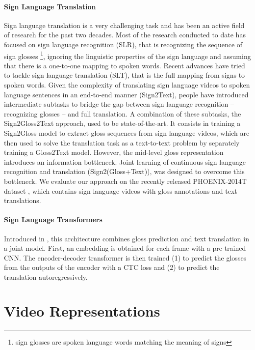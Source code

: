 \documentclass[final]{cvpr}
\begin{document}
\paragraph{Sign Language Translation}Sign language translation is a very challenging task and has been an active field of
research for the past two decades. Most of the research conducted to date has focused on sign language recognition (SLR), that is recognizing the sequence of sign glosses \footnote{sign glosses are spoken language words matching the meaning of signs}, ignoring the linguistic properties of the sign language and assuming that there is a one-to-one mapping to spoken words. Recent advances have tried to tackle sign language translation (SLT), that is the full mapping from signs to spoken words.
Given the complexity of translating sign language videos to spoken language sentences in an end-to-end manner (Sign2Text), people have introduced intermediate subtasks to bridge the gap between sign language recognition -- recognizing glosses -- and full translation. A combination of these subtasks, the Sign2Gloss2Text approach, used to be state-of-the-art. It consists in training a Sign2Gloss model to extract gloss sequences from sign language videos, which are then used to solve the translation task as a text-to-text problem by separately training a Gloss2Text model. However, the mid-level gloss representation introduces an information bottleneck. Joint learning of continuous sign language recognition and translation (Sign2(Gloss+Text)), was designed to overcome this bottleneck. We evaluate our approach on the recently released PHOENIX-2014T dataset \cite{phoenix}, which contains sign language videos with gloss annotations and text translations.
\paragraph{Sign Language Transformers}
Introduced in \cite{neccam}, this architecture combines gloss prediction and text translation in a joint model. First, an embedding is obtained for each frame with a pre-trained CNN. The encoder-decoder transformer is then trained (1) to predict the glosses from the outputs of the encoder with a CTC loss and (2) to predict the translation autoregressively.

\section{Video Representations}
\end{document}
